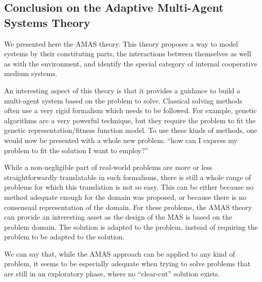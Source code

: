 \subsection{Conclusion on the Adaptive Multi-Agent Systems Theory}

We presented here the AMAS theory. This theory proposes a way to model systems by their constituting parts, the interactions between themselves as well as with the environment, and identify the special category of internal cooperative medium systems.

An interesting aspect of this theory is that it provides a guidance to build a multi-agent system based on the problem to solve. Classical solving methods often use a very rigid formalism which needs to be followed. For example, genetic algorithms are a very powerful technique, but they require the problem to fit the genetic representation/fitness function model. To use these kinds of methods, one would now be presented with a whole new problem: \enquote{how can I express my problem to fit the solution I want to employ?}

While a non-negligible part of real-world problems are more or less straightforwardly translatable in such formalisms, there is still a whole range of problems for which this translation is not so easy. This can be either because no method adequate enough for the domain was proposed, or because there is no consensual representation of the domain. For these problems, the AMAS theory can provide an interesting asset as the design of the MAS is based on the problem domain. The solution is adapted to the problem, instead of requiring the problem to be adapted to the solution.

We can say that, while the AMAS approach can be applied to any kind of problem, it seems to be especially adequate when trying to solve problems that are still in an exploratory phase, where no \enquote{clear-cut} solution exists.